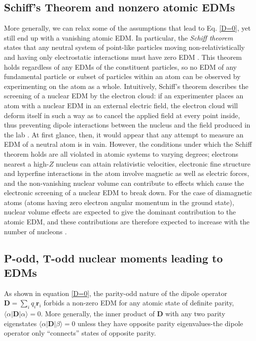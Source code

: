 \documentclass [10pt, twoside] {uwthesis}[2012/04/02]
\begin{document}
\subsection{Schiff's Theorem and nonzero atomic EDMs} \label{Schiff_Moment}
More generally, we can relax some of the assumptions that lead to Eq. \eqref{D=0}, yet still end up with a vanishing atomic EDM. In particular, the \textit{Schiff theorem} states that any neutral system of point-like particles moving non-relativistically and having only electrostatic interactions must have zero EDM \cite{1963_Schiff}. This theorem holds regardless of any EDMs of the constituent particles, so no EDM of any fundamental particle or subset of particles within an atom can be observed by experimenting on the atom as a whole. Intuitively, Schiff's theorem describes the screening of a nuclear EDM by the electron cloud: if an experimenter places an atom with a nuclear EDM in an external electric field, the electron cloud will deform itself in such a way as to cancel the applied field at every point inside, thus preventing dipole interactions between the nucleus and the field produced in the lab \cite[Sec. 6.1]{Khriplovich_Lamoreaux}. At first glance, then, it would appear that any attempt to measure an EDM of a neutral atom is in vain. However, the conditions under which the Schiff theorem holds are all violated in atomic systems to varying degrees; electrons nearest a high-$Z$ nucleus can attain relativistic velocities, electronic fine structure and hyperfine interactions in the atom involve magnetic as well as electric forces, and the non-vanishing nuclear volume can contribute to effects which cause the electronic screening of a nuclear EDM to break down. For the case of diamagnetic atoms (atoms having zero electron angular momentum in the ground state), nuclear volume effects are expected to give the dominant contribution to the atomic EDM, and these contributions are therefore expected to increase with the number of nucleons \cite{2007_Liu_et._al._Schiff_Theorem_and_Corrections}.

\subsection{P-odd, T-odd nuclear moments leading to EDMs}
As shown in equation \eqref{D=0}, the parity-odd nature of the dipole operator $\mathbf{D} = \sum_{i}q_i\mathbf{r}_i$ forbids a non-zero EDM for any atomic state of definite parity, $\langle\alpha\vert\mathbf{D}\vert\alpha\rangle=0$. More generally, the inner product of $\mathbf{D}$ with any two parity eigenstates $\langle\alpha\vert\mathbf{D}\vert\beta\rangle=0$ unless they have opposite parity eigenvalues-the dipole operator only ``connects'' states of opposite parity. 
\end{document}
